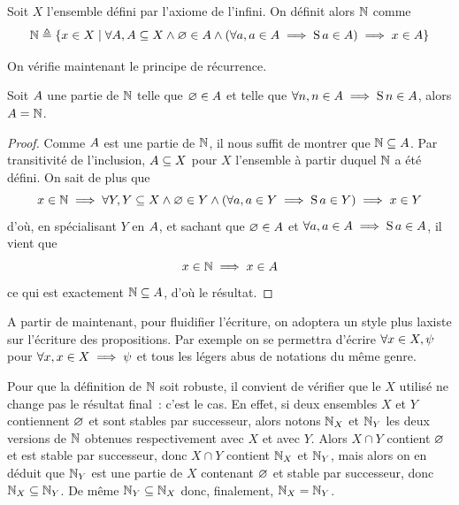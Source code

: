 \begin{definition}
  Soit $X$ l'ensemble défini par l'axiome de l'infini. On définit alors
  $\bN$ comme
  \[\mathbb N \triangleq \left\{ x\in X \;\middle\vert\; \forall A, A\subseteq X\land
    \varnothing \in A \land (\forall a, a \in A \implies \operatorname{S} a\in A)
    \implies x\in A \right\}\]
  \index[notation]{$\bN$}
\end{definition}

\noindent
On vérifie maintenant le principe de récurrence.

\begin{theorem}[Récurrence]
  Soit $A$ une partie de $\bN$ telle que $\varnothing \in A$ et telle que
  $\forall n, n \in A \implies \operatorname{S} n \in A$, alors $A = \mathbb N$.
\end{theorem}

\begin{proof}
  Comme $A$ est une partie de $\bN$, il nous suffit de montrer que
  $\mathbb N \subseteq A$. Par transitivité de l'inclusion,
  $A\subseteq X$ pour $X$ l'ensemble à partir duquel $\bN$ a été défini.
  On sait de plus que
  \[x \in \mathbb N \implies \forall Y, Y\subseteq X \land
  \varnothing \in Y \land (\forall a, a \in Y \implies \operatorname{S} a \in Y)
  \implies x\in Y\]
  d'où, en spécialisant $Y$ en $A$, et sachant que $\varnothing\in A$ et
  $\forall a, a \in A \implies \operatorname{S} a \in A$, il vient que
  \[x\in \mathbb N \implies x \in A\] ce qui est exactement
  $\mathbb N\subseteq A$, d'où le résultat.
\end{proof}

\begin{notation}
  A partir de maintenant, pour fluidifier l'écriture, on adoptera un style plus
  laxiste sur l'écriture des propositions. Par exemple on se permettra d'écrire
  $\forall x \in X, \psi$ pour $\forall x, x\in X \implies \psi$ et tous les
  légers abus de notations du même genre.
\end{notation}

\begin{remark}
  Pour que la définition de $\bN$ soit robuste, il convient de vérifier
  que le $X$ utilisé ne change pas le résultat final~: c'est le cas. En effet,
  si deux ensembles $X$ et $Y$ contiennent $\varnothing$ et sont stables par
  successeur, alors notons $\mathbb N_X$ et $\mathbb N_Y$ les deux versions de
  $\bN$ obtenues respectivement avec $X$ et avec $Y$. Alors $X\cap Y$
  contient $\varnothing$ et est stable par successeur, donc $X\cap Y$ contient
  $\mathbb N_X$ et $\mathbb N_Y$, mais alors on en déduit que $\mathbb N_Y$ est
  une partie de $X$ contenant $\varnothing$ et stable par successeur, donc
  $\mathbb N_X \subseteq \mathbb N_Y$. De même $\mathbb N_Y\subseteq\mathbb N_X$ donc, finalement,
  $\mathbb N_X = \mathbb N_Y$.
\end{remark}

